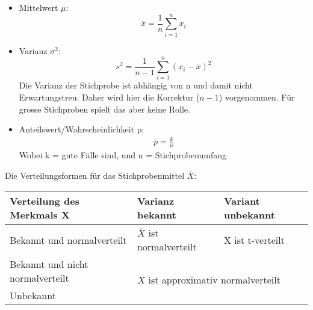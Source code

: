 \begin{itemize}
	\item Mittelwert $\mu$: 
	\begin{equation}
	\overline{x} = \frac{1}{n}\displaystyle\sum^{n}_{i=1} x_i
	\end{equation}
	\item Varianz $\sigma^{2}$: 
	\begin{equation}
	s^{2}=\frac{1}{n-1} \displaystyle\sum_{i=1}^{n}(x_i - \overline{x})^{2}
	\end{equation}
	Die Varianz der Stichprobe ist abhängig von n und damit nicht Erwartungstreu. Daher wird hier die Korrektur ($n-1$) vorgenommen. Für grosse Stichproben spielt das aber keine Rolle.
	\item Anteilswert/Wahrscheinlichkeit p: 
	\begin{eqnarray}
	\overline{p} = \frac{k}{n}
	\end{eqnarray}
	 Wobei k = gute Fälle sind, und n = Stichprobenumfang
\end{itemize}

Die Verteilungsformen für das Stichprobenmittel $\overline{X}$:
\begin{table}[ht]
\centering
\begin{tabular}{@{}l|ll@{}}
\toprule
Verteilung des Merkmals X & Varianz bekannt & Variant unbekannt \\ \midrule
Bekannt und normalverteilt & $\overline{X}$ ist normalverteilt & X ist t-verteilt \\ 
Bekannt und nicht normalverteilt & \multicolumn{2}{l}{\multirow{2}{*}{$X$ ist approximativ normalverteilt}} \\
Unbekannt & \multicolumn{2}{l}{} \\ \bottomrule
\end{tabular}
\end{table} \\
